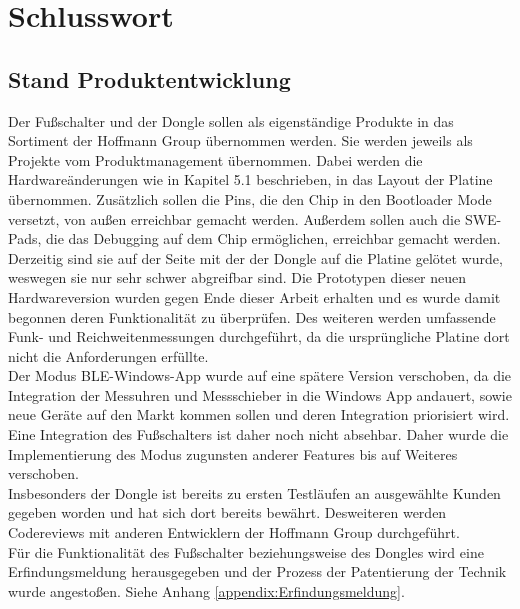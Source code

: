 \section{Schlusswort}

\subsection{Stand Produktentwicklung}
Der Fußschalter und der Dongle sollen als eigenständige Produkte in das Sortiment der Hoffmann Group übernommen werden. Sie werden jeweils als Projekte vom Produktmanagement übernommen. Dabei werden die Hardwareänderungen wie in Kapitel 5.1 beschrieben, in das Layout der Platine übernommen. Zusätzlich sollen die Pins, die den Chip in den Bootloader Mode versetzt, von außen erreichbar gemacht werden. Außerdem sollen auch die SWE-Pads, die das Debugging auf dem Chip ermöglichen, erreichbar gemacht werden. Derzeitig sind sie auf der Seite mit der der Dongle auf die Platine gelötet wurde, weswegen sie nur sehr schwer abgreifbar sind. Die Prototypen dieser neuen Hardwareversion wurden gegen Ende dieser Arbeit erhalten und es wurde damit begonnen deren Funktionalität zu überprüfen. Des weiteren werden umfassende Funk- und Reichweitenmessungen durchgeführt, da die ursprüngliche Platine dort nicht die Anforderungen erfüllte.\\
Der Modus \ac{BLE}-Windows-App wurde auf eine spätere Version verschoben, da die Integration der Messuhren und Messschieber in die Windows App andauert, sowie neue Geräte auf den Markt kommen sollen und deren Integration priorisiert wird. Eine Integration des Fußschalters ist daher noch nicht absehbar. Daher wurde die Implementierung des Modus zugunsten anderer Features bis auf Weiteres verschoben.\\
Insbesonders der Dongle ist bereits zu ersten Testläufen an ausgewählte Kunden gegeben worden und hat sich dort bereits bewährt. Desweiteren werden Codereviews mit anderen Entwicklern der Hoffmann Group durchgeführt.\\
Für die Funktionalität des Fußschalter beziehungsweise des Dongles wird eine Erfindungsmeldung herausgegeben und der Prozess der Patentierung der Technik wurde angestoßen. Siehe Anhang \ref{appendix:Erfindungsmeldung}.

